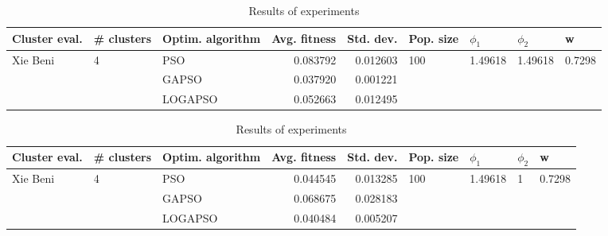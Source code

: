 \documentclass{article}
\begin{document}
\begin{table}
\centering
\caption{Results of experiments}
\begin{tabular}{lllrrllll}
\toprule
            Cluster eval. &        \# clusters & Optim. algorithm &  Avg. fitness &  Std. dev. &            Pop. size &               $\phi_{1}$ &               $\phi_{2}$ &                       w \\
\midrule
\multirow{3}{*}{Xie Beni} & \multirow{3}{*}{4} &              PSO &      0.083792 &   0.012603 & \multirow{3}{*}{100} & \multirow{3}{*}{1.49618} & \multirow{3}{*}{1.49618} & \multirow{3}{*}{0.7298} \\
                          &                    &            GAPSO &      0.037920 &   0.001221 &                      &                          &                          &                         \\
                          &                    &          LOGAPSO &      0.052663 &   0.012495 &                      &                          &                          &                         \\
\bottomrule
\end{tabular}
\end{table}
\begin{table}
\centering
\caption{Results of experiments}
\begin{tabular}{lllrrllll}
\toprule
            Cluster eval. &        \# clusters & Optim. algorithm &  Avg. fitness &  Std. dev. &            Pop. size &               $\phi_{1}$ &         $\phi_{2}$ &                       w \\
\midrule
\multirow{3}{*}{Xie Beni} & \multirow{3}{*}{4} &              PSO &      0.044545 &   0.013285 & \multirow{3}{*}{100} & \multirow{3}{*}{1.49618} & \multirow{3}{*}{1} & \multirow{3}{*}{0.7298} \\
                          &                    &            GAPSO &      0.068675 &   0.028183 &                      &                          &                    &                         \\
                          &                    &          LOGAPSO &      0.040484 &   0.005207 &                      &                          &                    &                         \\
\bottomrule
\end{tabular}
\end{table}
\end{document}
